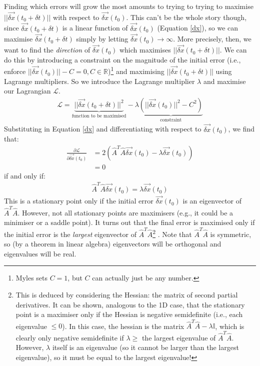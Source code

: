Finding which errors will grow the most amounts to trying to trying to maximise $||\vec{\delta x}(t_0+\delta t)||$ with respect to $\vec{\delta x}(t_0)$. This can't be the whole story though, since $\vec{\delta x}(t_0+\delta t)$ is a linear function of $\vec{\delta x}(t_0)$ (Equation \ref{dx}), so we can maximise $\vec{\delta x}(t_0+\delta t)$ simply by letting $\vec{\delta x}(t_0)\to\infty$. More precisely, then, we want to find the \textit{direction} of $\vec{\delta x}(t_0)$ which maximises $||\vec{\delta x}(t_0+\delta t)||$. We can do this by introducing a constraint on the magnitude of the initial error (i.e., enforce $||\vec{\delta x}(t_0)||-C=0,C\in\mathbb{R}$)\footnote{Myles sets $C=1$, but $C$ can actually just be any number.} and maximising $||\vec{\delta x}(t_0+\delta t)||$ using Lagrange multipliers. So we introduce the Lagrange multiplier $\lambda$ and maximise our Lagrangian $\mathscr{L}$.
\begin{align}
    \mathscr{L}=\underbrace{||\vec{\delta x}(t_0+\delta t)||^2}_{\text{function to be maximised}}-\lambda\underbrace{(||\vec{\delta x}(t_0)||^2-C^2)}_\text{constraint}
\end{align}
Substituting in Equation \ref{dx} and differentiating with respect to $\vec{\delta x}(t_0)$, we find that:
\begin{align*}
    \frac{\partial\mathscr{L}}{\partial\vec{\delta x
    }(t_0)}&=2(\hat{A}^T\hat{A}\vec{\delta x}(t_0)-\lambda\vec{\delta x}(t_0))\\
    &=0
\end{align*}
if and only if:
\begin{align*}
    \hat{A}^T\hat{A}\vec{\delta x}(t_0)=\lambda\vec{\delta x}(t_0)
\end{align*}
This is a stationary point only if the initial error $\vec{\delta x}(t_0)$ is an eigenvector of $\hat{A}^T\hat{A}$. However, not all stationary points are maximisers (e.g., it could be a minimiser or a saddle point). It turns out that the final error is maximised only if the initial error is the \textit{largest} eigenvector of $\hat{A}^T\hat{A}$\footnote{
    This is deduced by considering the Hessian: the matrix of second partial derivatives. It can be shown, analogous to the 1D case, that the stationary point is a maximiser only if the Hessian is negative semidefinite (i.e., each eigenvalue $\leq0$). In this case, the hessian is the matrix $\hat{A}^T\hat{A}-\lambda\mathbb{I}$, which is clearly only negative semidefinite if $\lambda\geq$ the largest eigenvalue of $\hat{A}^T\hat{A}$. However, $\lambda$ itself is an eigenvalue (so it cannot be larger than the largest eigenvalue), so it must be equal to the largest eigenvalue!}
. Note that $\hat{A}^T\hat{A}$ is symmetric, so (by a theorem in linear algebra) eigenvectors will be orthogonal and eigenvalues will be real.

